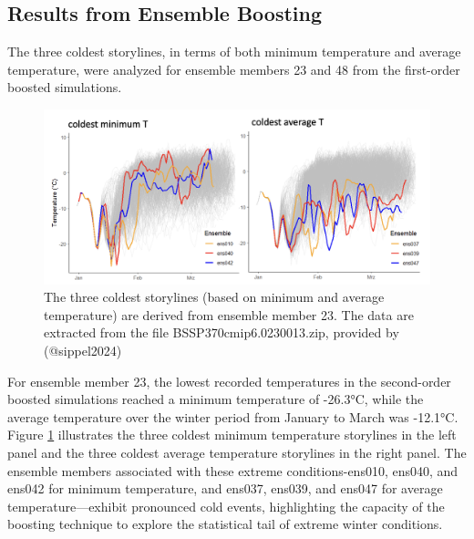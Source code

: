 \documentclass[
]{krantz}
\begin{document}
\subsection{Results from Ensemble Boosting}\label{results-from-ensemble-boosting}

The three coldest storylines, in terms of both minimum temperature and average temperature, were analyzed for ensemble members 23 and 48 from the first-order boosted simulations.

\begin{figure}

{\centering \includegraphics[width=0.9\linewidth]{work/03-coldex/figures/boosting_results23} 

}

\caption{The three coldest storylines (based on minimum and average temperature) are derived from ensemble member 23. The data are extracted from the file BSSP370cmip6.0230013.zip, provided by (@sippel2024)}\label{fig:boosting-result23}
\end{figure}

For ensemble member 23, the lowest recorded temperatures in the second-order boosted simulations reached a minimum temperature of -26.3°C, while the average temperature over the winter period from January to March was -12.1°C. Figure \ref{fig:boosting-result23} illustrates the three coldest minimum temperature storylines in the left panel and the three coldest average temperature storylines in the right panel. The ensemble members associated with these extreme conditions-ens010, ens040, and ens042 for minimum temperature, and ens037, ens039, and ens047 for average temperature---exhibit pronounced cold events, highlighting the capacity of the boosting technique to explore the statistical tail of extreme winter conditions.
\end{document}
